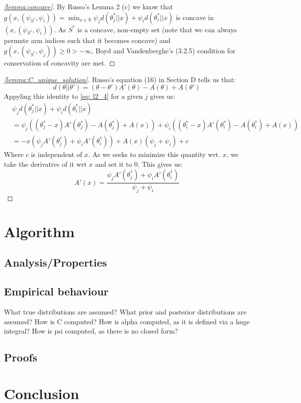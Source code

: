 \begin{proof}[\ref{lemma:concave}]
  By Russo's Lemma 2 (c) we know that $g(x, (\psi_{S^*}, \psi_i)) = \min_{x \in \mathbb{R}} \psi_{j}d(\theta^*_{j} || x) + \psi_{i}d(\theta_{i}^* ||x)$ is concave in $(x, (\psi_{S^*}, \psi_i))$. As $S^*$ is a concave, non-empty set (note that we can always permute arm indices such that it becomes concave) and $g(x, (\psi_{S^*}, \psi_j)) \geq 0 > -\infty$, Boyd and Vandenberghe's \cite{Boyd:2004:CO:993483} (3.2.5) condition for conservation of concavity are met.
\end{proof}

\begin{proof}[\ref{lemma:C_unique_solution}]
  Russo's equation (16) in Section D tells us that:
  \[d(\theta||\theta') = (\theta - \theta')A'(\theta) - A(\theta) + A(\theta')\]
  Appyling this identity to \eqref{eq: l2_4} for a given $j$ gives us:
  \begin{align}
    &\psi_{j}d(\theta^*_{j} || x) + \psi_{i}d(\theta_{i}^* ||x) \\
    &=\psi_j ((\theta_j^* - x)A'(\theta_j^*) - A(\theta_j^*) + A(x)) + \psi_i((\theta_i^* - x)A'(\theta_i^*) - A(\theta_i^*) + A(x))\\
    &= -x(\psi_j A'(\theta_j^*) + \psi_i A'(\theta_i^*)) + A(x)(\psi_j + \psi_i) + c
  \end{align}
  Where $c$ is independent of $x$. As we seeks to minimize this quantity wrt. $x$, we take the derivative of it wrt $x$ and set it to 0. This gives us:
  \[A'(x) = \frac{\psi_j A'(\theta_j^*) + \psi_i A'(\theta_i^*)}{\psi_j + \psi_i}\]
\end{proof}

\chapter{Algorithm}
\section{Analysis/Properties}
\section{Empirical behaviour}\label{section:empirical_behaviour}
What true distributions are assumed?
What prior and posterior distributions are assumed?
How is C computed?
How is alpha computed, as it is defined via a huge integral?
How is psi computed, as there is no closed form?
\section{Proofs}

\chapter{Conclusion}
